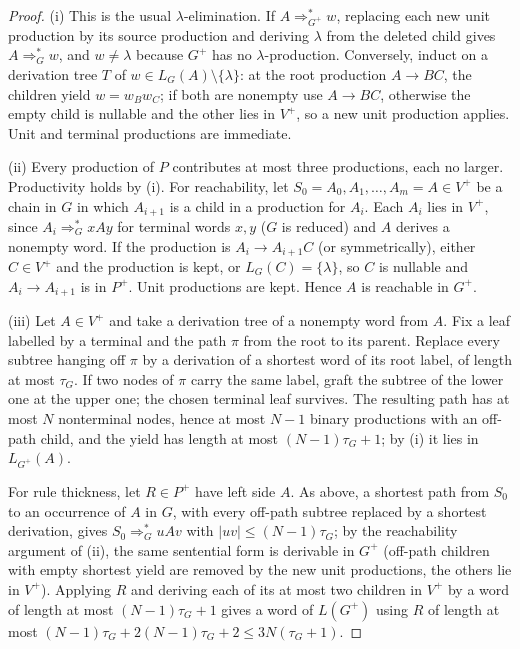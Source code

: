 \documentclass[11pt]{article}
\numberwithin{equation}{section}
\theoremstyle{plain}
\theoremstyle{definition}
\theoremstyle{remark}
\theoremstyle{plain}
\begin{document}
\begin{proof}
(i) This is the usual $\lambda$-elimination.  If $A\Rightarrow_{G^+}^*w$, replacing
each new unit production by its source production and deriving $\lambda$ from
the deleted child gives $A\Rightarrow_G^*w$, and $w\ne\lambda$ because $G^+$ has no
$\lambda$-production.  Conversely, induct on a derivation tree $T$ of
$w\in L_G(A)\setminus\{\lambda\}$: at the root production $A\to BC$, the
children yield $w=w_Bw_C$; if both are nonempty use $A\to BC$, otherwise the
empty child is nullable and the other lies in $V^+$, so a new unit production
applies.  Unit and terminal productions are immediate.

(ii) Every production of $P$ contributes at most three productions, each no
larger.  Productivity holds by (i).  For reachability, let
$S_0=A_0,A_1,\ldots,A_m=A\in V^+$ be a chain in $G$ in which $A_{i+1}$ is a
child in a production for $A_i$.  Each $A_i$ lies in $V^+$, since
$A_i\Rightarrow_G^*xAy$ for terminal words $x,y$ \textup($G$ is reduced\textup)
and $A$ derives a nonempty word.  If the production is $A_i\to A_{i+1}C$
\textup(or symmetrically\textup), either $C\in V^+$ and the production is
kept, or $L_G(C)=\{\lambda\}$, so $C$ is nullable and $A_i\to A_{i+1}$ is in
$P^+$.  Unit productions are kept.  Hence $A$ is reachable in $G^+$.

(iii) Let $A\in V^+$ and take a derivation tree of a nonempty word from $A$.
Fix a leaf labelled by a terminal and the path $\pi$ from the root to its
parent.  Replace every subtree hanging off $\pi$ by a derivation of a shortest
word of its root label, of length at most $\tau_G$.  If two nodes of $\pi$ carry
the same label, graft the subtree of the lower one at the upper one; the
chosen terminal leaf survives.  The resulting path has at most $N$
nonterminal nodes, hence at most $N-1$ binary productions with an off-path
child, and the yield has length at most $(N-1)\tau_G+1$; by (i) it lies in
$L_{G^+}(A)$.

For rule thickness, let $R\in P^+$ have left side $A$.  As above, a shortest
path from $S_0$ to an occurrence of $A$ in $G$, with every off-path subtree
replaced by a shortest derivation, gives $S_0\Rightarrow_G^*uAv$ with
$|uv|\le(N-1)\tau_G$; by the reachability argument of (ii), the same
sentential form is derivable in $G^+$ \textup(off-path children with empty
shortest yield are removed by the new unit productions, the others lie in
$V^+$\textup).  Applying $R$ and deriving each of its at most two children in
$V^+$ by a word of length at most $(N-1)\tau_G+1$ gives a word of $L(G^+)$ using
$R$ of length at most $(N-1)\tau_G+2(N-1)\tau_G+2\le3N(\tau_G+1)$.
\end{proof}
\end{document}
